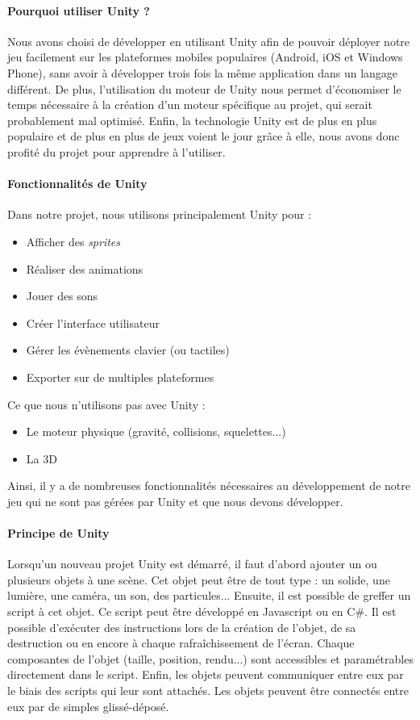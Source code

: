 \paragraph{Pourquoi utiliser Unity ?}

Nous avons choisi de développer en utilisant Unity afin de pouvoir déployer notre jeu facilement sur les plateformes mobiles populaires (Android, iOS et Windows Phone), sans avoir à développer trois fois la même application dans un langage différent. De plus, l'utilisation du moteur de Unity nous permet d'économiser le temps nécessaire à la création d'un moteur spécifique au projet, qui serait probablement mal optimisé. Enfin, la technologie Unity est de plus en plus populaire et de plus en plus de jeux voient le jour grâce à elle, nous avons donc profité du projet pour apprendre à l'utiliser.
 
\paragraph{Fonctionnalités de Unity}
Dans notre projet, nous utilisons principalement Unity pour :
\begin{itemize}
\item Afficher des \textit{sprites}
\item Réaliser des animations
\item Jouer des sons
\item Créer l'interface utilisateur
\item Gérer les évènements clavier (ou tactiles)
\item Exporter sur de  multiples plateformes
\end{itemize}
Ce que nous n'utilisons pas avec Unity :
\begin{itemize}
\item Le moteur physique (gravité, collisions, squelettes...)
\item La 3D
\end{itemize}
Ainsi, il y a de nombreuses fonctionnalités nécessaires au développement de notre jeu qui ne sont pas gérées par Unity et que nous devons développer.
 
\paragraph{Principe de Unity}
Lorsqu'un nouveau projet Unity est démarré, il faut d'abord ajouter un ou plusieurs objets à une scène. Cet objet peut être de tout type : un solide, une lumière, une caméra, un son, des particules... Ensuite, il est possible de greffer un script à cet objet. Ce script peut être développé en Javascript ou en C\#. Il est possible d'exécuter des instructions lors de la création de l'objet, de sa destruction ou en encore à chaque rafraîchissement de l'écran. Chaque composantes de l'objet (taille, position, rendu...) sont accessibles et paramétrables directement dans le script. Enfin, les objets peuvent communiquer entre eux par le biais des scripts qui leur sont attachés. Les objets peuvent être connectés entre eux par de simples glissé-déposé.

